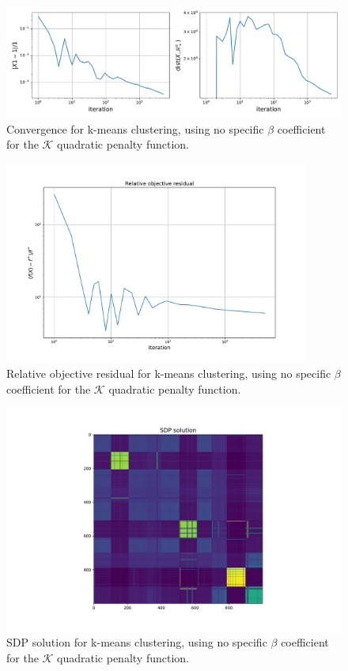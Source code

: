 \documentclass[12pt]{article}
\begin{document}
\begin{figure}[H]
    \centering
    \includegraphics[width=17cm]{hw4/code/part3/results/no_beta/convergence.pdf}
    \caption{Convergence for k-means clustering, using no specific $\beta$ coefficient for the $\mathcal{K}$ quadratic penalty function.}
    \label{fig:no-beta-convergence}
\end{figure}
\begin{figure}[H]
    \centering
    \includegraphics[width=10cm]{hw4/code/part3/results/no_beta/relative_objective_residual.pdf}
    \caption{Relative objective residual for k-means clustering, using no specific $\beta$ coefficient for the $\mathcal{K}$ quadratic penalty function.}
    \label{fig:no-beta-relative-obj-res}
\end{figure}
\begin{figure}[H]
    \centering
    \includegraphics[width=12cm]{hw4/code/part3/results/no_beta/heatmap.pdf}
    \caption{SDP solution for k-means clustering, using no specific $\beta$ coefficient for the $\mathcal{K}$ quadratic penalty function.}
    \label{fig:no-beta-heatmap}
\end{figure}
\end{document}
